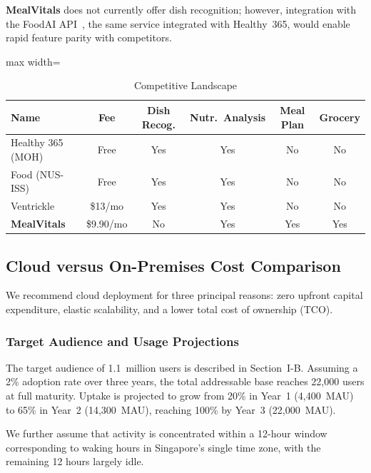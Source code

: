 \documentclass[conference]{IEEEtran}
\begin{document}
\textbf{MealVitals} does not currently offer dish recognition; however, integration with the FoodAI API~\cite{b5}, the same service integrated with Healthy~365, would enable rapid feature parity with competitors.

\begin{table}[H]
\caption{Competitive Landscape}
\label{tab:competitors}
\begin{center}
\begin{adjustbox}{max width=\columnwidth}
\begin{tabular}{lccccc}
\toprule
\textbf{Name} & \textbf{Fee} & \textbf{Dish Recog.} & \textbf{Nutr.\ Analysis} & \textbf{Meal Plan} & \textbf{Grocery} \\
\midrule
Healthy 365 (MOH) & Free & Yes & Yes & No & No \\
Food (NUS-ISS) & Free & Yes & Yes & No & No \\
Ventrickle & \$13/mo & Yes & Yes & No & No \\
\textbf{MealVitals} & \$9.90/mo & No & Yes & Yes & Yes \\
\bottomrule
\end{tabular}
\end{adjustbox}
\end{center}
\end{table}

\subsection{Cloud versus On-Premises Cost Comparison}

We recommend cloud deployment for three principal reasons: zero upfront capital expenditure, elastic scalability, and a lower total cost of ownership (TCO).

\subsubsection{Target Audience and Usage Projections}
The target audience of 1.1~million users is described in Section~I-B. Assuming a 2\% adoption rate over three years, the total addressable base reaches 22,000 users at full maturity. Uptake is projected to grow from 20\% in Year~1 (4,400~MAU) to 65\% in Year~2 (14,300~MAU), reaching 100\% by Year~3 (22,000~MAU).

We further assume that activity is concentrated within a 12-hour window corresponding to waking hours in Singapore's single time zone, with the remaining 12 hours largely idle.
\end{document}
